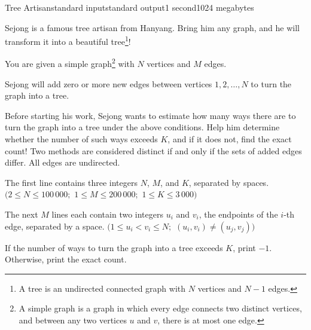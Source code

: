 \begin{problem}{Tree Artisan}{standard input}{standard output}{1 second}{1024 megabytes}

Sejong is a famous tree artisan from Hanyang. Bring him any graph, and he will transform it into a beautiful tree\footnote{A tree is an undirected connected graph with $N$ vertices and $N-1$ edges.}!

You are given a simple graph\footnote{A simple graph is a graph in which every edge connects two distinct vertices, and between any two vertices $u$ and $v$, there is at most one edge.} with $N$ vertices and $M$ edges.

Sejong will add zero or more new edges between vertices $1, 2, \ldots, N$ to turn the graph into a tree.

Before starting his work, Sejong wants to estimate how many ways there are to turn the graph into a tree under the above conditions. Help him determine whether the number of such ways exceeds $K$, and if it does not, find the exact count! Two methods are considered distinct if and only if the sets of added edges differ. All edges are undirected.

\InputFile
The first line contains three integers $N$, $M$, and $K$, separated by spaces. $(2 \le N \le 100\, 000;$ $1 \le M \le 200\, 000;$ $1 \le K \le 3\, 000)$

The next $M$ lines each contain two integers $u_i$ and $v_i$, the endpoints of the $i$-th edge, separated by a space. $(1 \le u_i \lt v_i \le N;$ $(u_i, v_i) \ne (u_j, v_j) )$

\OutputFile
If the number of ways to turn the graph into a tree exceeds $K$, print $-1$. Otherwise, print the exact count.

\Examples

\begin{example}
%
%
\end{example}

\end{problem}

